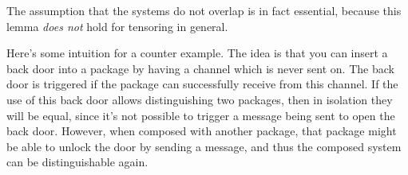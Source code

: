 The assumption that the systems do not overlap is in fact essential,
because this lemma \emph{does not} hold for tensoring in general.

Here's some intuition for a counter example.
The idea is that you can insert a back door into a package
by having a channel which is never sent on.
The back door is triggered if the package can successfully receive
from this channel.
If the use of this back door allows distinguishing two packages,
then in isolation they will be equal, since it's not
possible to trigger a message being sent to open the back door.
However, when composed with another package,
that package might be able to unlock the door by sending a message,
and thus the composed system can be distinguishable again.
